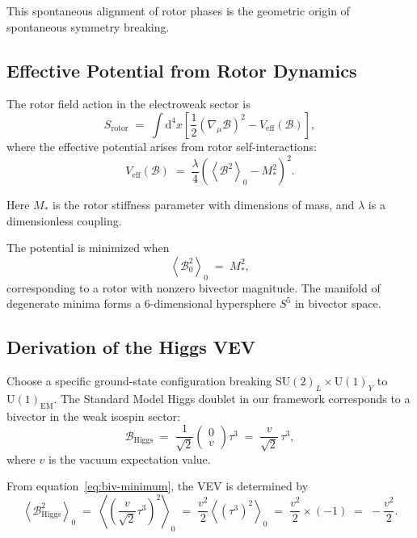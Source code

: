 \documentclass[11pt,a4paper]{article}
\newcommand{\grade}[2]{\left\langle #1 \right\rangle_{#2}}
\newcommand{\scal}[1]{\grade{#1}{0}}
\newcommand{\Biv}{\mathcal{B}}
\newcommand{\D}{\nabla}                        %
\newcommand{\SU}{\mathrm{SU}}
\newcommand{\U}{\mathrm{U}}
\theoremstyle{definition}
\theoremstyle{plain}
\theoremstyle{remark}
\begin{document}
This spontaneous alignment of rotor phases is the geometric origin of spontaneous symmetry breaking.

\subsection{Effective Potential from Rotor Dynamics}

The rotor field action in the electroweak sector is
\begin{equation}
  S_{\text{rotor}} \;=\; \int \mathrm{d}^4x \left[\frac{1}{2}(\D_\mu\Biv)^2 - V_{\text{eff}}(\Biv)\right],
  \label{eq:rotor-action}
\end{equation}
where the effective potential arises from rotor self-interactions:
\begin{equation}
  V_{\text{eff}}(\Biv) \;=\; \frac{\lambda}{4}\left(\scal{\Biv^2} - M_\ast^2\right)^2.
  \label{eq:rotor-potential}
\end{equation}

Here $M_\ast$ is the rotor stiffness parameter with dimensions of mass, and $\lambda$ is a dimensionless coupling.

The potential is minimized when
\begin{equation}
  \scal{\Biv_0^2} \;=\; M_\ast^2,
  \label{eq:biv-minimum}
\end{equation}
corresponding to a rotor with nonzero bivector magnitude. The manifold of degenerate minima forms a 6-dimensional hypersphere $S^5$ in bivector space.

\subsection{Derivation of the Higgs VEV}

Choose a specific ground-state configuration breaking $\SU(2)_L \times \U(1)_Y$ to $\U(1)_{\text{EM}}$. The Standard Model Higgs doublet in our framework corresponds to a bivector in the weak isospin sector:
\begin{equation}
  \Biv_{\text{Higgs}} \;=\; \frac{1}{\sqrt{2}}\begin{pmatrix} 0 \\ v \end{pmatrix} \tau^3
  \;=\; \frac{v}{\sqrt{2}}\,\tau^3,
\end{equation}
where $v$ is the vacuum expectation value.

From equation~\eqref{eq:biv-minimum}, the VEV is determined by
\begin{equation}
  \scal{\Biv_{\text{Higgs}}^2} \;=\; \scal{\left(\frac{v}{\sqrt{2}}\tau^3\right)^2}
  \;=\; \frac{v^2}{2}\scal{(\tau^3)^2}
  \;=\; \frac{v^2}{2} \times (-1)
  \;=\; -\frac{v^2}{2}.
\end{equation}
\end{document}
